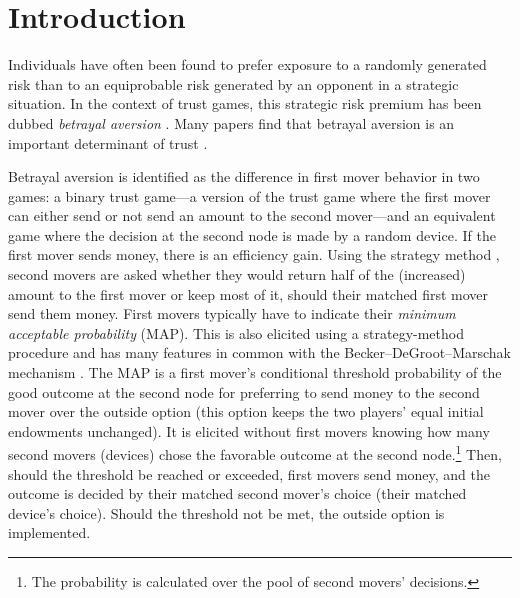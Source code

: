 \section{Introduction}\label{sec:intro}
Individuals have often been found to prefer exposure to a randomly generated risk than to an equiprobable risk generated by an opponent in a strategic situation.
In the context of trust games, this strategic risk premium has been dubbed \textit{betrayal aversion} \citep{Bohnet2004}.
Many papers find that betrayal aversion is an important determinant of trust \citep{Bohnet2004, Aimone2015, Fairley2016, Quercia2016, Bacine2018, Butler2018, Polipciuc2022motive}.

Betrayal aversion is identified as the difference in first mover behavior in two games: a binary trust game---a version of the trust game \citep{Berg1995} where the first mover can either send or not send an amount to the second mover---and an equivalent game where the decision at the second node is made by a random device.
If the first mover sends money, there is an efficiency gain.
Using the strategy method \citep{Selten1967}, second movers are asked whether they would return half of the (increased) amount to the first mover or keep most of it, should their matched first mover send them money.
First movers typically have to indicate their \textit{minimum acceptable probability} (MAP).
This is also elicited using a strategy-method procedure and has many features in common with the Becker--DeGroot--Marschak mechanism \citep[in short, BDM]{Becker1964}.
The MAP is a first mover's conditional threshold probability of the good outcome at the second node for preferring to send money to the second mover over the outside option (this option keeps the two players' equal initial endowments unchanged).
It is elicited without first movers knowing how many second movers (devices) chose the favorable outcome at the second node.\footnote{
The probability is calculated over the pool of second movers' decisions.
}
Then, should the threshold be reached or exceeded, first movers send money, and the outcome is decided by their matched second mover's choice (their matched device's choice).
Should the threshold not be met, the outside option is implemented.

